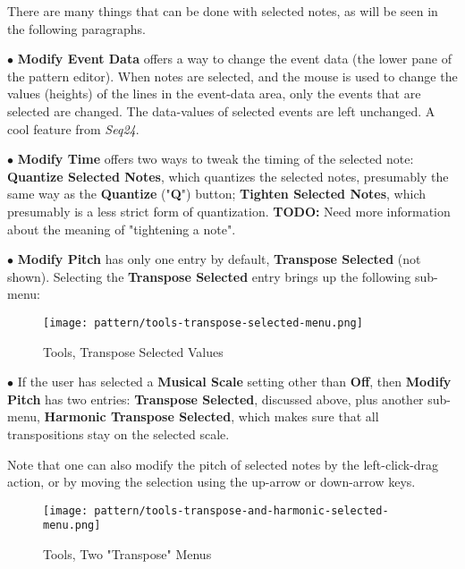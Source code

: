    There are many things that can be done with selected notes, as will be seen
   in the following paragraphs.

   $\bullet$ \textbf{Modify Event Data} offers a way to change the event data
   (the lower pane of the pattern editor).  When notes are selected, and the
   mouse is used to change the values (heights) of the lines in the event-data
   area, only the events that are selected are changed.  The data-values of
   selected events are left unchanged.  A cool feature from \textsl{Seq24}.

   $\bullet$ \textbf{Modify Time} offers two ways to tweak the timing of the
   selected note:
   \textbf{Quantize Selected Notes}, which quantizes the selected
   notes, presumably the same way as the \textbf{Quantize} ("\textbf{Q}")
   button;
   \textbf{Tighten Selected Notes}, which presumably is a less
   strict form of quantization.
   \textbf{TODO:}
   Need more information about the meaning of "tightening a note".

   $\bullet$ \textbf{Modify Pitch} has only one entry by default,
   \textbf{Transpose Selected} (not shown).
   Selecting the \textbf{Transpose Selected} entry
   brings up the following sub-menu:

\begin{figure}[H]
   \centering 
   \texttt{[image: pattern/tools-transpose-selected-menu.png]}
   \caption{Tools, Transpose Selected Values}
   \label{fig:pattern_editor_tools_transpose_selected_menu}
\end{figure}

   $\bullet$ If the user has selected a
   \textbf{Musical Scale} setting other than \textbf{Off},
   then \textbf{Modify Pitch} has two entries:
   \textbf{Transpose Selected}, discussed above, plus
   another sub-menu,
   \textbf{Harmonic Transpose Selected}, which makes sure that all
   transpositions stay on the selected scale.

   Note that one can also modify the pitch of selected notes by the
   left-click-drag action, or by moving the selection using the
   up-arrow or down-arrow keys.

\begin{figure}[H]
   \centering 
   \texttt{[image: pattern/tools-transpose-and-harmonic-selected-menu.png]}
   \caption{Tools, Two "Transpose" Menus}
   \label{fig:pattern_editor_tools_two_transpose_menus}
\end{figure}

